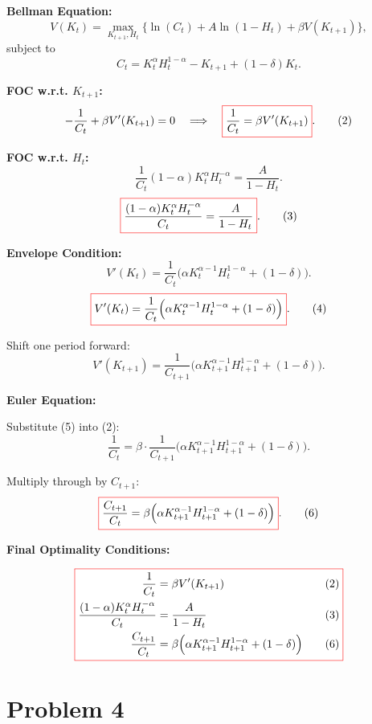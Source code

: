 \documentclass[12pt]{article}
\begin{document}
\noindent \textbf{Bellman Equation:}
\[
V(K_t) = \max_{K_{t+1},H_t} 
\Big\{ \ln(C_t) + A\ln(1-H_t) + \beta V(K_{t+1}) \Big\},
\]
subject to
\[
C_t = K_t^{\alpha} H_t^{1-\alpha} - K_{t+1} + (1-\delta)K_t. \tag{1}
\]

\noindent \textbf{FOC w.r.t. \(K_{t+1}\):}
\[
-\frac{1}{C_t} + \beta V'(K_{t+1}) = 0 
\quad \Longrightarrow \quad
\fcolorbox{red}{white}{$ \displaystyle \frac{1}{C_t} = \beta V'(K_{t+1}) $}. \tag{2}
\]

\noindent \textbf{FOC w.r.t. \(H_t\):}
\[
\frac{1}{C_t}(1-\alpha)K_t^{\alpha} H_t^{-\alpha} = \frac{A}{1-H_t}.
\]
\[
\fcolorbox{red}{white}{$
\displaystyle 
\frac{(1-\alpha)K_t^{\alpha} H_t^{-\alpha}}{C_t} = \frac{A}{1-H_t}
$}. \tag{3}
\]

\noindent \textbf{Envelope Condition:}
\[
V'(K_t) = \frac{1}{C_t}\Big(\alpha K_t^{\alpha-1}H_t^{1-\alpha} + (1-\delta)\Big).
\]
\[
\fcolorbox{red}{white}{$
\displaystyle 
V'(K_t) = \frac{1}{C_t}\Big(\alpha K_t^{\alpha-1}H_t^{1-\alpha} + (1-\delta)\Big)
$}. \tag{4}
\]

\noindent Shift one period forward:
\[
V'(K_{t+1}) = \frac{1}{C_{t+1}}
\Big(\alpha K_{t+1}^{\alpha-1}H_{t+1}^{1-\alpha} + (1-\delta)\Big). \tag{5}
\]

\noindent \textbf{Euler Equation:}

Substitute (5) into (2):
\[
\frac{1}{C_t} = \beta \cdot \frac{1}{C_{t+1}}
\Big(\alpha K_{t+1}^{\alpha-1}H_{t+1}^{1-\alpha} + (1-\delta)\Big).
\]

Multiply through by \(C_{t+1}\):
\[
\fcolorbox{red}{white}{$
\displaystyle 
\frac{C_{t+1}}{C_t} = \beta \Big(\alpha K_{t+1}^{\alpha-1}H_{t+1}^{1-\alpha} + (1-\delta)\Big)
$}. \tag{6}
\]

\noindent \textbf{Final Optimality Conditions:}

\[
\fcolorbox{red}{white}{$
\begin{aligned}
\frac{1}{C_t} &= \beta V'(K_{t+1}) \quad &(2) \\
\frac{(1-\alpha)K_t^{\alpha}H_t^{-\alpha}}{C_t} &= \frac{A}{1-H_t} \quad &(3) \\
\frac{C_{t+1}}{C_t} &= \beta\Big(\alpha K_{t+1}^{\alpha-1}H_{t+1}^{1-\alpha} + (1-\delta)\Big) \quad &(6)
\end{aligned}
$}
\]

\section*{\noindent\textbf{Problem 4}}
\end{document}
